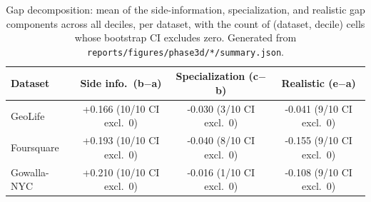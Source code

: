 \begin{table}[t]
\centering
\caption{Gap decomposition: mean of the side-information, specialization, and realistic gap components across all deciles, per dataset, with the count of (dataset, decile) cells whose bootstrap CI excludes zero. Generated from \texttt{reports/figures/phase3d/*/summary.json}.}
\label{tab:gap-decomposition}
\small
\begin{tabular}{@{}lccc@{}}
\toprule
Dataset & Side info.\ (b$-$a) & Specialization (c$-$b) & Realistic (e$-$a) \\
\midrule
GeoLife & +0.166 (10/10 CI excl.\ 0) & -0.030 (3/10 CI excl.\ 0) & -0.041 (9/10 CI excl.\ 0) \\
Foursquare & +0.193 (10/10 CI excl.\ 0) & -0.040 (8/10 CI excl.\ 0) & -0.155 (9/10 CI excl.\ 0) \\
Gowalla-NYC & +0.210 (10/10 CI excl.\ 0) & -0.016 (1/10 CI excl.\ 0) & -0.108 (9/10 CI excl.\ 0) \\
\bottomrule
\end{tabular}
\end{table}
